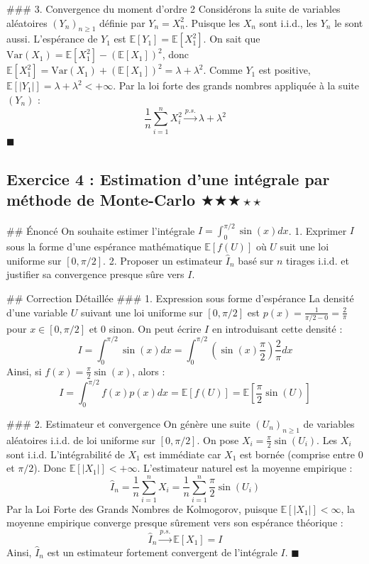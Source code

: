 \documentclass[11pt,a4paper]{article}
\begin{document}
\#\#\# 3. Convergence du moment d'ordre 2
Considérons la suite de variables aléatoires $(Y_n)_{n \ge 1}$ définie par $Y_n = X_n^2$.
Puisque les $X_n$ sont i.i.d., les $Y_n$ le sont aussi.
L'espérance de $Y_1$ est $\mathbb{E}[Y_1] = \mathbb{E}[X_1^2]$.
On sait que $\text{Var}(X_1) = \mathbb{E}[X_1^2] - (\mathbb{E}[X_1])^2$, donc $\mathbb{E}[X_1^2] = \text{Var}(X_1) + (\mathbb{E}[X_1])^2 = \lambda + \lambda^2$.
Comme $Y_1$ est positive, $\mathbb{E}[|Y_1|] = \lambda + \lambda^2 < +\infty$.
Par la loi forte des grands nombres appliquée à la suite $(Y_n)$ :
$$ \frac{1}{n} \sum_{i=1}^n X_i^2 \xrightarrow{p.s.} \lambda + \lambda^2 $$ $\blacksquare$


\subsection*{Exercice 4 : Estimation d'une intégrale par méthode de Monte-Carlo \quad $\bigstar\bigstar\bigstar\star\star$}

\#\# Énoncé
On souhaite estimer l'intégrale $I = \int_0^{\pi/2} \sin(x) dx$.
1. Exprimer $I$ sous la forme d'une espérance mathématique $\mathbb{E}[f(U)]$ où $U$ suit une loi uniforme sur $[0, \pi/2]$.
2. Proposer un estimateur $\hat{I}_n$ basé sur $n$ tirages i.i.d. et justifier sa convergence presque sûre vers $I$.

\#\# Correction Détaillée
\#\#\# 1. Expression sous forme d'espérance
La densité d'une variable $U$ suivant une loi uniforme sur $[0, \pi/2]$ est $p(x) = \frac{1}{\pi/2 - 0} = \frac{2}{\pi}$ pour $x \in [0, \pi/2]$ et $0$ sinon.
On peut écrire $I$ en introduisant cette densité :
$$ I = \int_0^{\pi/2} \sin(x) dx = \int_0^{\pi/2} \left( \sin(x) \frac{\pi}{2} \right) \frac{2}{\pi} dx $$
Ainsi, si $f(x) = \frac{\pi}{2} \sin(x)$, alors :
$$ I = \int_0^{\pi/2} f(x) p(x) dx = \mathbb{E}[f(U)] = \mathbb{E}\left[ \frac{\pi}{2} \sin(U) \right] $$

\#\#\# 2. Estimateur et convergence
On génère une suite $(U_n)_{n \ge 1}$ de variables aléatoires i.i.d. de loi uniforme sur $[0, \pi/2]$.
On pose $X_i = \frac{\pi}{2} \sin(U_i)$. Les $X_i$ sont i.i.d.
L'intégrabilité de $X_1$ est immédiate car $X_1$ est bornée (comprise entre $0$ et $\pi/2$). Donc $\mathbb{E}[|X_1|] < +\infty$.
L'estimateur naturel est la moyenne empirique :
$$ \hat{I}_n = \frac{1}{n} \sum_{i=1}^n X_i = \frac{1}{n} \sum_{i=1}^n \frac{\pi}{2} \sin(U_i) $$
Par la Loi Forte des Grands Nombres de Kolmogorov, puisque $\mathbb{E}[|X_1|] < \infty$, la moyenne empirique converge presque sûrement vers son espérance théorique :
$$ \hat{I}_n \xrightarrow{p.s.} \mathbb{E}[X_1] = I $$
Ainsi, $\hat{I}_n$ est un estimateur fortement convergent de l'intégrale $I$. $\blacksquare$
\end{document}
